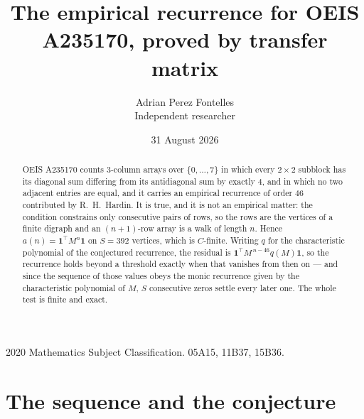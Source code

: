 \documentclass[11pt,a4paper]{article}
\title{The empirical recurrence for OEIS A235170, proved by transfer matrix}
\author{Adrian Perez Fontelles\\ \small Independent researcher}
\date{31 August 2026}
\theoremstyle{plain}
\theoremstyle{definition}
\begin{document}
\maketitle

\begin{abstract}
OEIS A235170 counts $3$-column arrays over $\{0,\dots,7\}$ in which every
$2\times2$ subblock has its diagonal sum differing from its antidiagonal sum by
exactly $4$, and in which no two adjacent entries are equal, and it
carries an empirical recurrence of order $46$ contributed by R.~H.~Hardin. It is true,
and it is not an empirical matter: the condition constrains only consecutive pairs of rows,
so the rows are the vertices of a finite digraph and an $(n+1)$-row array is a walk of
length $n$. Hence $a(n)=\mathbf{1}^{\!\top}M^{n}\mathbf{1}$ on $S=392$ vertices, which
is $C$-finite. Writing $q$ for the characteristic polynomial of the conjectured recurrence,
the residual is $\mathbf{1}^{\!\top}M^{\,n-46}q(M)\mathbf{1}$, so the recurrence
holds beyond a threshold exactly when that vanishes from then on --- and since the sequence
of those values obeys the monic recurrence given by the characteristic polynomial of $M$,
$S$ consecutive zeros settle every later one. The whole test is finite and exact.
\end{abstract}

\noindent\small 2020 Mathematics Subject Classification. 05A15, 11B37, 15B36.\normalsize

\section{The sequence and the conjecture}
\end{document}
